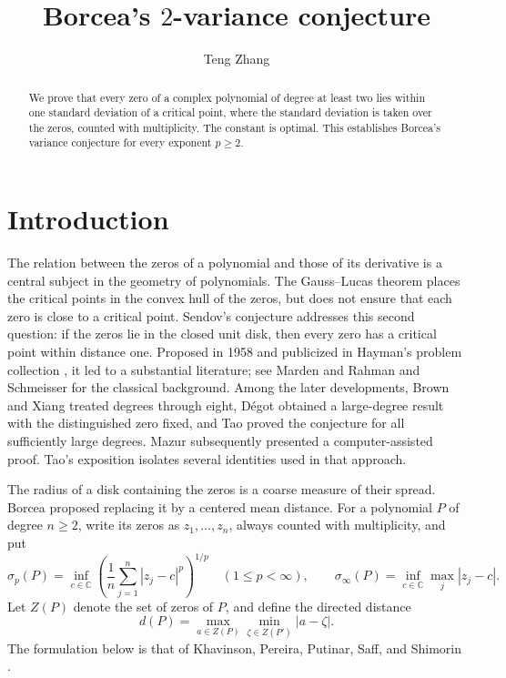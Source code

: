\documentclass[11pt,reqno]{amsart}
\title[Borcea's 2-variance conjecture]{Borcea's $2$-variance conjecture}
\author{Teng Zhang}
\date{}
\theoremstyle{definition}
\theoremstyle{remark}
\numberwithin{equation}{section}
\newcommand{\C}{\mathbb C}
\begin{document}
\begin{abstract}
We prove that every zero of a complex polynomial of degree at least two lies within one standard deviation of a critical point, where the standard deviation is taken over the zeros, counted with multiplicity. The constant is optimal. This establishes Borcea's variance conjecture for every exponent $p\ge2$.
\end{abstract}
\maketitle

\section{Introduction}\label{sec:intro}

The relation between the zeros of a polynomial and those of its derivative is a central subject in the geometry of polynomials. The Gauss--Lucas theorem places the critical points in the convex hull of the zeros, but does not ensure that each zero is close to a critical point. Sendov's conjecture addresses this second question: if the zeros lie in the closed unit disk, then every zero has a critical point within distance one. Proposed in 1958 and publicized in Hayman's problem collection \cite{Hay67}, it led to a substantial literature; see Marden \cite{Mar66} and Rahman and Schmeisser \cite{RS02} for the classical background. Among the later developments, Brown and Xiang \cite{BX99} treated degrees through eight, D\'egot \cite{Deg14} obtained a large-degree result with the distinguished zero fixed, and Tao \cite{Tao22} proved the conjecture for all sufficiently large degrees. Mazur \cite{Maz26} subsequently presented a computer-assisted proof. Tao's exposition \cite{Tao26} isolates several identities used in that approach.

The radius of a disk containing the zeros is a coarse measure of their spread. Borcea proposed replacing it by a centered mean distance. For a polynomial $P$ of degree $n\ge2$, write its zeros as $z_1,\ldots,z_n$, always counted with multiplicity, and put
\begin{equation}\label{eq:sigma}
 \sigma_p(P)=\inf_{c\in\C}
 \left(\frac1n\sum_{j=1}^n|z_j-c|^p\right)^{1/p}
 \quad(1\le p<\infty),
 \qquad
 \sigma_\infty(P)=\inf_{c\in\C}\max_j|z_j-c|.
\end{equation}
Let $Z(P)$ denote the set of zeros of $P$, and define the directed distance
\[
 d(P)=\max_{a\in Z(P)}\min_{\zeta\in Z(P')}|a-\zeta|.
\]
The formulation below is that of Khavinson, Pereira, Putinar, Saff, and Shimorin \cite[Definition~2.1 and Conjecture~1]{KPPSS11}.
\end{document}
